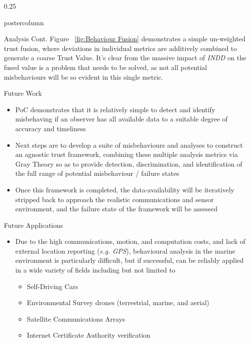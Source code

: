 \documentclass[final,hyperref={pdfpagelabels=false}]{beamer}
\def\colwidth{0.25\linewidth}
\begin{document}
\begin{frame}[fragile]
\begin{columns}[t]
\begin{column}{\colwidth}
\begin{beamercolorbox}[center,wd=\textwidth]{postercolumn}
\begin{minipage}[T]{.98\textwidth}
{\begin{block}{Analysis Cont.}
              Figure ~\ref{fig:Behaviour Fusion} demonstrates a simple un-weighted trust fusion, where deviations in individual metrics are additively combined to generate a coarse Trust Value. It's clear from the massive impact of \emph{INDD} on the fused value is a problem that needs to be solved, as not all potential misbehaviours will be so evident in this single metric.
            \end{block}
            \begin{block}{Future Work}
              \begin{itemize}
                \item PoC demonstrates that it is relatively simple to detect and identify misbehaving if an observer has all available data to a suitable degree 
                  of accuracy and timeliness
                \item Next steps are to develop a suite of misbehaviours and analyses to construct an agnostic trust framework, combining these 
                  multiple analysis metrics via Gray Theory so as to provide detection, discrimination, and identification of the full range of 
                  potential misbehaviour / failure states
                \item Once this framework is completed, the data-availability will be iteratively stripped back to approach the realistic communications and sensor environment, and the failure state of the framework will be assessed
              \end{itemize}
            \end{block}           
            \begin{block}{Future Applications}
              \begin{itemize}
                \item Due to the high communications, motion, and computation costs, and lack of external location reporting (\emph{e.g. GPS}), 
                  behavioural analysis in the marine environment is particularly difficult, but if successful, can be reliably applied in a wide 
                  variety of fields including but not limited to
                \begin{itemize}
                  \item Self-Driving Cars
                  \item Environmental Survey drones (terrestrial, marine, and aerial)
                  \item Satellite Communications Arrays
                  \item Internet Certificate Authority verification

\end{itemize}
\end{itemize}
\end{block}}
\end{minipage}
\end{beamercolorbox}
\end{column}
\end{columns}
\end{frame}
\end{document}
